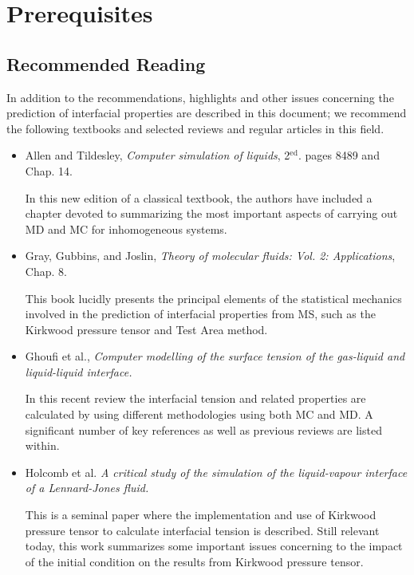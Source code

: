 \documentclass[9pt,bestpractices]{livecoms}
\begin{document}
\section{Prerequisites}
\subsection{Recommended Reading}
In addition to the recommendations, highlights and other issues concerning the
prediction of interfacial properties are described in this document; we
recommend the following textbooks and selected reviews and regular articles in
this field. 

\begin{itemize}
  \item Allen and Tildesley, \textit{Computer simulation of liquids}, 2$^{\mathrm{ed}}$. pages 84\textendash{}89 and Chap. 14. \citep{allen2017}

In this new edition of a classical textbook, the authors have included a chapter devoted to summarizing the most important aspects of carrying out MD and MC for inhomogeneous systems.

\item Gray, Gubbins, and Joslin, \textit{Theory of molecular fluids: Vol. 2: Applications}, Chap. 8. \citep{gray2011}

This book lucidly presents the principal elements of the statistical mechanics involved in the prediction of interfacial properties from MS, such as the Kirkwood pressure tensor and Test Area method.

\item Ghoufi et al., \textit{Computer modelling of the surface tension of the gas-liquid and liquid-liquid interface.} \citep{ghoufi2016}

  In this recent review the interfacial tension and related properties are calculated by using different methodologies using both MC and MD. A significant number of key references as well as previous reviews are listed within.

\item Holcomb et al. \textit{A critical study of the simulation of the liquid-vapour
interface of a Lennard-Jones fluid.} \citep{holcomb1993}

  This is a 
  seminal paper where the implementation and use of Kirkwood pressure
  tensor to calculate interfacial tension is described. Still relevant today,
  this work summarizes some important issues concerning to the impact of the
  initial condition on the results from Kirkwood pressure tensor.


\end{itemize}
\end{document}
